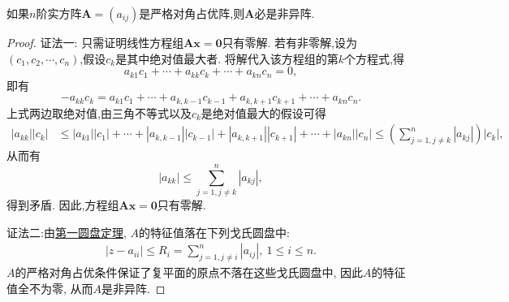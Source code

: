 \documentclass[../../main.tex]{subfiles}%
\begin{document}
\begin{proposition}[严格对角占优阵必是非异阵]\label{proposition:严格对角占优阵必是非异阵}
如果\(n\)阶实方阵\(\boldsymbol{A}=(a_{ij})\)是严格对角占优阵,则\(\boldsymbol{A}\)必是非异阵.
\end{proposition}
\begin{proof}

{\color{blue}证法一:}
只需证明线性方程组\(\boldsymbol{A}\boldsymbol{x}=\boldsymbol{0}\)只有零解. 若有非零解,设为\((c_1,c_2,\cdots,c_n)\),假设\(c_k\)是其中绝对值最大者. 将解代入该方程组的第\(k\)个方程式,得
\[
a_{k1}c_1+\cdots + a_{kk}c_k+\cdots + a_{kn}c_n = 0,
\]
即有
\[
-a_{kk}c_k=a_{k1}c_1+\cdots + a_{k,k - 1}c_{k - 1}+a_{k,k + 1}c_{k + 1}+\cdots + a_{kn}c_n.
\]
上式两边取绝对值,由三角不等式以及\(c_k\)是绝对值最大的假设可得
\begin{align*}
|a_{kk}||c_k|&\leqslant |a_{k1}||c_1|+\cdots + |a_{k,k - 1}||c_{k - 1}|+|a_{k,k + 1}||c_{k + 1}|+\cdots + |a_{kn}||c_n|\leqslant \left(\sum_{j = 1,j\neq k}^{n}|a_{kj}|\right)|c_k|,
\end{align*}
从而有
\[
|a_{kk}|\leqslant \sum_{j = 1,j\neq k}^{n}|a_{kj}|,
\]
得到矛盾. 因此,方程组\(\boldsymbol{A}\boldsymbol{x}=\boldsymbol{0}\)只有零解.

{\color{blue}证法二:}由\hyperref[theorem:第一圆盘定理]{第一圆盘定理}, \(A\)的特征值落在下列戈氏圆盘中:
\begin{align*}
|z - a_{ii}| \leqslant  R_{i} = \sum_{j = 1,j\neq i}^{n}|a_{ij}|,\ 1 \leqslant  i \leqslant  n.
\end{align*}
\(A\)的严格对角占优条件保证了复平面的原点不落在这些戈氏圆盘中, 因此\(A\)的特征值全不为零, 从而\(A\)是非异阵.

\end{proof}
\end{document}
